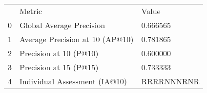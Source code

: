 \begin{tabular}{lll}
 & Metric & Value \\
0 & Global Average Precision & 0.666565 \\
1 & Average Precision at 10 (AP@10) & 0.781865 \\
2 & Precision at 10 (P@10) & 0.600000 \\
3 & Precision at 15 (P@15) & 0.733333 \\
4 & Individual Assessment (IA@10) & RRRRNNNRNR \\
\end{tabular}
